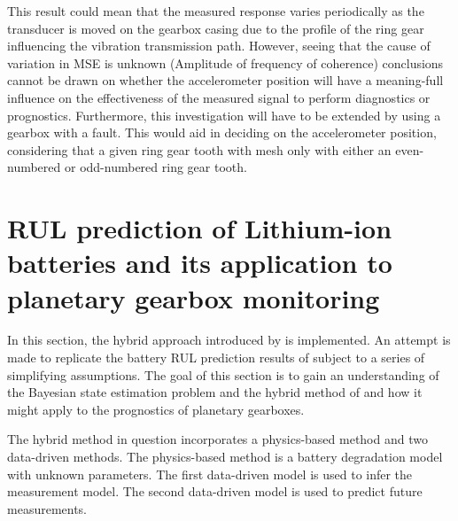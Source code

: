 This result could mean that the measured response varies periodically as the transducer is moved on the gearbox casing due to the profile of the ring gear influencing the vibration transmission path. However, seeing that the cause of variation in MSE is unknown (Amplitude of frequency of coherence) conclusions cannot be drawn on whether the accelerometer position will have a meaning-full influence on the effectiveness of the measured signal to perform diagnostics or prognostics. Furthermore, this investigation will have to be extended by using a gearbox with a fault. This would aid in deciding on the accelerometer position, considering that a given ring gear tooth with mesh only with either an even-numbered or odd-numbered ring gear tooth. 







\section{RUL prediction of Lithium-ion batteries and its application to planetary gearbox monitoring} \label{S:Liao battery}

In this section, the hybrid approach introduced by \cite{Liao2016} is implemented. An attempt is made to replicate the battery RUL prediction results of \cite{Liao2016} subject to a series of simplifying assumptions. The goal of this section is to gain an understanding of the Bayesian state estimation problem and the hybrid method of \cite{Liao2016} and how it might apply to the prognostics of planetary gearboxes.

The hybrid method in question incorporates a physics-based method and two data-driven methods. The physics-based method is a battery degradation model with unknown parameters. The first data-driven model is used to infer the measurement model. The second data-driven model is used to predict future measurements.


%




